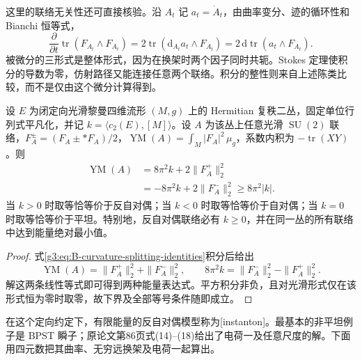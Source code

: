 \ProseParagraphBreak
这里的联络无关性还可直接核验。沿 \(A_t\) 记 \(a_t=\dot A_t\)，由曲率变分、迹的循环性和 Bianchi 恒等式，
\[
	\frac{\partial}{\partial t}\operatorname{tr}(F_{A_t}\wedge F_{A_t})
	=2\operatorname{tr}(\mathrm d_{A_t}a_t\wedge F_{A_t})
	=2\,\mathrm d\operatorname{tr}(a_t\wedge F_{A_t}).
\]
被微分的三形式是整体形式，因为在换架时两个因子同时共轭。Stokes 定理使积分的导数为零，仿射路径又能连接任意两个联络。积分的整性则来自上述陈类比较，而不是仅由这个微分计算得到。

\begin{theorem}\label{g3:thm:B-yang-mills-topological-bound}
	设 \(E\) 为闭定向光滑黎曼四维流形 \((M,g)\) 上的 Hermitian 复秩二丛，固定单位行列式平凡化，并记 \(k=\langle c_2(E),[M]\rangle\)。设 \(A\) 为该丛上任意光滑 \(\operatorname{SU}(2)\) 联络，\(F_A^\pm=(F_A\pm*F_A)/2\)，\(\operatorname{YM}(A)=\int_M|F_A|^2\,\mu_g\)，系数内积为 \(-\operatorname{tr}(XY)\)。则
	\begin{equation}\label{g3:eq:B-yang-mills-topological-identity}
	\begin{aligned}
		\operatorname{YM}(A)
		&=8\pi^2k+2\|F_A^+\|_2^2\\
		&=-8\pi^2k+2\|F_A^-\|_2^2
		\ge8\pi^2|k|.
	\end{aligned}
	\end{equation}
	当 \(k>0\) 时取等恰等价于反自对偶；当 \(k<0\) 时取等恰等价于自对偶；当 \(k=0\) 时取等恰等价于平坦。特别地，反自对偶联络必有 \(k\ge0\)，并在同一丛的所有联络中达到能量绝对最小值。
\end{theorem}
\begin{proof}
	式\eqref{g3:eq:B-curvature-splitting-identities}积分后给出
	\[
		\operatorname{YM}(A)=\|F_A^+\|_2^2+\|F_A^-\|_2^2,
		\qquad
		8\pi^2k=\|F_A^-\|_2^2-\|F_A^+\|_2^2.
	\]
	解这两条线性等式即可得到两种能量表达式。平方积分非负，且对光滑形式仅在该形式恒为零时取零，故下界及全部等号条件随即成立。
\end{proof}

在这个定向约定下，有限能量的反自对偶模型称为[instanton]。最基本的非平坦例子是 BPST 瞬子；原论文第86页式(14)--(18)给出了电荷一及任意尺度的解\cite[第86页，式(14)--(18)]{BelavinPolyakovSchwartzTyupkin1975Instanton}。下面用四元数把其曲率、无穷远换架及电荷一起算出。

